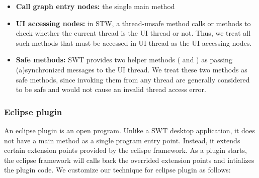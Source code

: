 \begin{itemize}

\item \textbf{Call graph entry nodes: } the single main method

\item \textbf{UI accessing nodes: } in STW, a thread-unsafe method calls 
or  methods to check whether the current thread is the UI thread or not. Thus,
we treat all such methods that must be accessed in UI thread as the UI accessing nodes.

\item \textbf{Safe methods: } SWT provides two helper methods (
and ) as passing (a)synchronized messages to the UI thread.
We treat these two methods as safe methods, since invoking
them from any thread are generally considered to be safe and
would not cause an invalid thread access error.

\end{itemize}

\subsubsection{Eclipse plugin}

An eclipse plugin is an open program. Unlike a SWT desktop application, it does not
have a main method as a single program entry point. Instead, it extends certain
extension points provided by the eclispe framework. As a plugin starts, the eclipse
framework will calls back the overrided extension points and intializes the plugin code.
We customize our technique for eclipse plugin as follows:


